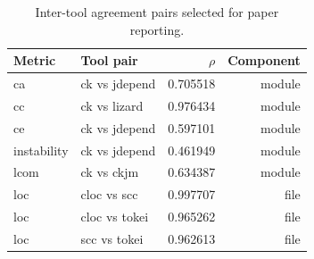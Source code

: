 \begin{table}[t]
\centering
\caption{Inter-tool agreement pairs selected for paper reporting.}
\label{tab:agreement-pairs-auto}
\begin{tabular}{llrr}
\toprule
Metric & Tool pair & $\rho$ & Component \\
\midrule
ca & ck vs jdepend & 0.705518 & module \\
cc & ck vs lizard & 0.976434 & module \\
ce & ck vs jdepend & 0.597101 & module \\
instability & ck vs jdepend & 0.461949 & module \\
lcom & ck vs ckjm & 0.634387 & module \\
loc & cloc vs scc & 0.997707 & file \\
loc & cloc vs tokei & 0.965262 & file \\
loc & scc vs tokei & 0.962613 & file \\
\bottomrule
\end{tabular}
\end{table}
